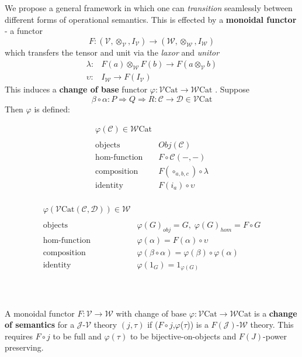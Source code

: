 \documentclass[a4paper,UKenglish]{article}
\theoremstyle{definition}
\newcommand{\Cat}{\mathrm{Cat}}
\newcommand{\V}{\mathscr{V}}
\newcommand{\W}{\mathscr{W}}
\newcommand{\C}{\mathscr{C}}
\newcommand{\D}{\mathscr{D}}
\newcommand{\J}{\mathscr{J}}
\begin{document}
We propose a general framework in which one can \textit{transition} seamlessly between different forms of operational semantics. This is effected by a \textbf{monoidal functor} - a functor $$F: (\V,\otimes_\V,I_\V) \to (\W,\otimes_\W,I_\W)$$ which transfers the tensor and unit via the \textit{laxor} and \textit{unitor}
\[\begin{array}{rl}
\lambda: & F(a) \otimes_\W F(b) \to F(a\otimes_\V b)\\
\upsilon: & I_\W \to F(I_\V)
\end{array}\]
This induces a \textbf{change of base} functor $\varphi:\V\Cat \to \W\Cat$ \cite{borceux}. Suppose $$\beta \circ \alpha: P \Rightarrow Q \Rightarrow R: \C \to \D \in \V\Cat$$ Then $\varphi$ is defined:\\
\begin{minipage}{.2 \textwidth}
	\[\begin{array}{rl}
	\varphi(\C) \in \W\Cat\\
	\\
	\text{objects} & Obj(\C)\\
	\text{hom-function} & F \circ \C(-,-)\\
	\text{composition} & F(\circ_{a,b,c}) \circ \lambda\\
	\text{identity} & F(i_a) \circ \upsilon\\
	\end{array}\]
\end{minipage}\qquad \qquad
\begin{minipage}{.2 \textwidth}
	\[\begin{array}{rl}
	\varphi(\V\Cat(\C,\D)) \in \W\\
	\\
	\text{objects} & \varphi(G)_{obj} = G, \; \varphi(G)_{hom} = F\circ G\\
	\text{hom-function} & \varphi(\alpha) = F(\alpha) \circ \upsilon\\
	\text{composition} & \varphi(\beta \circ \alpha) = \varphi(\beta) \circ \varphi(\alpha)\\
	\text{identity} & \varphi(1_G) = 1_{\varphi(G)}\\
	\end{array}\]
\end{minipage}\\~\\

A monoidal functor $F:\V \to \W$ with change of base $\varphi:\V\Cat \to \W\Cat$ is a \textbf{change of semantics} for a $\J$-$\V$ theory $(j,\tau)$ if ($F\circ j$,$\varphi$($\tau$)) is a $F(\J)$-$\W$ theory. This requires $F\circ j$ to be full and $\varphi(\tau)$ to be bijective-on-objects and $F(J)$-power preserving.
\end{document}

